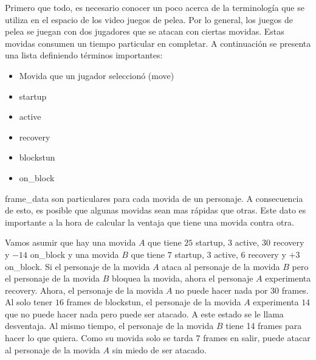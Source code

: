 Primero que todo, es necesario conocer un poco acerca de la terminología que se utiliza en el espacio de los video juegos de pelea. Por lo general, los juegos de pelea se juegan con dos jugadores que se atacan con ciertas movidas. Estas movidas consumen un tiempo particular en completar. A continuación se presenta una lista definiendo términos importantes:
\begin{itemize}
    \item Movida que un jugador seleccionó (move)
    \item \gls{startup}
    \item \gls{active}
    \item \gls{recovery}
    \item \gls{blockstun}
    \item \gls{on_block}
\end{itemize}

\gls{frame_data} son particulares para cada movida de un personaje. A consecuencia de esto, es posible que algunas movidas sean mas rápidas que otras. Este dato es importante a la hora de calcular la ventaja que tiene una movida contra otra. 

Vamos asumir que hay una movida $A$ que tiene $25$ \gls{startup}, $3$ \gls{active}, $30$ \gls{recovery} y $-14$ \gls{on_block} y una movida $B$ que tiene $7$ \gls{startup}, $3$ \gls{active}, $6$ \gls{recovery} y $+3$ \gls{on_block}. Si el personaje de la movida $A$ ataca al personaje de la movida $B$ pero el personaje de la movida $B$ bloquea la movida, ahora el personaje $A$ experimenta \gls{recovery}. Ahora, el personaje de la movida $A$ no puede hacer nada por $30$ frames. Al solo tener $16$ frames de \gls{blockstun}, el personaje de la movida $A$ experimenta $14$ que no puede hacer nada pero puede ser atacado. A este estado se le llama desventaja. Al mismo tiempo, el personaje de la movida $B$ tiene 14 frames para hacer lo que quiera. Como su movida solo se tarda $7$ frames en salir, puede atacar al personaje de la movida $A$ sin miedo de ser atacado.